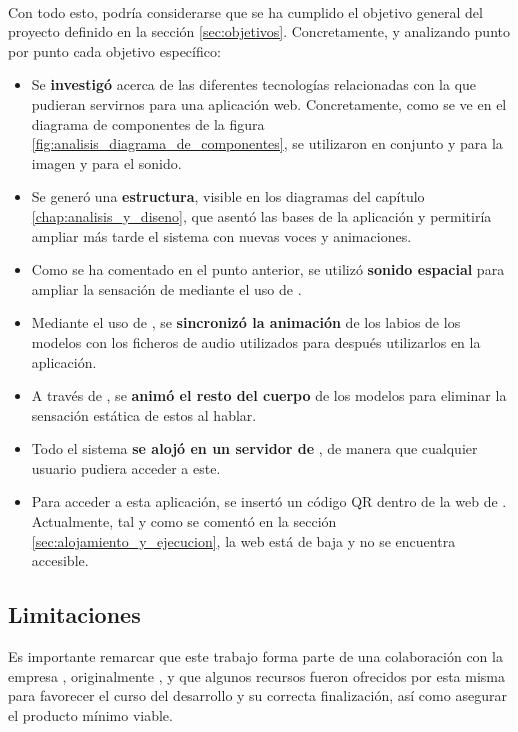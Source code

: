 \documentclass{subfiles}
\begin{document}
    \paragraph{}
    Con todo esto, podría considerarse que se ha cumplido el objetivo general del proyecto definido en la sección \ref{sec:objetivos}. Concretamente, y analizando punto por punto cada objetivo específico:
    \begin{itemize}
        \item Se \textbf{investigó} acerca de las diferentes tecnologías relacionadas con la \ra que pudieran servirnos para una aplicación web. Concretamente, como se ve en el diagrama de componentes de la figura \ref{fig:analisis_diagrama_de_componentes}, se utilizaron en conjunto \webxr y \threejs para la imagen y \resonanceaudio para el sonido.
        \item Se generó una \textbf{estructura}, visible en los diagramas del capítulo \ref{chap:analisis_y_diseno}, que asentó las bases de la aplicación y permitiría ampliar más tarde el sistema con nuevas voces y animaciones.
        \item Como se ha comentado en el punto anterior, se utilizó \textbf{sonido espacial} para ampliar la sensación de \ra mediante el uso de \resonanceaudio.
        \item Mediante el uso de \rhubarb, se \textbf{sincronizó la animación} de los labios de los modelos con los ficheros de audio utilizados para después utilizarlos en la aplicación.
        \item A través de \blender, se \textbf{animó el resto del cuerpo} de los modelos para eliminar la sensación estática de estos al hablar.
        \item Todo el sistema \textbf{se alojó en un servidor de \aws}, de manera que cualquier usuario pudiera acceder a este.
        \item Para acceder a esta aplicación, se insertó un código QR dentro de la web de \silverstorm. Actualmente, tal y como se comentó en la sección \ref{sec:alojamiento_y_ejecucion}, la web está de baja y no se encuentra accesible.
    \end{itemize}

    \subsection{Limitaciones}
    \label{sec:pasos_fallidos}
    
    Es importante remarcar que este trabajo forma parte de una colaboración con la empresa \thirdera, originalmente \silverstorm, y que algunos recursos fueron ofrecidos por esta misma para favorecer el curso del desarrollo y su correcta finalización, así como asegurar el producto mínimo viable.
\end{document}

